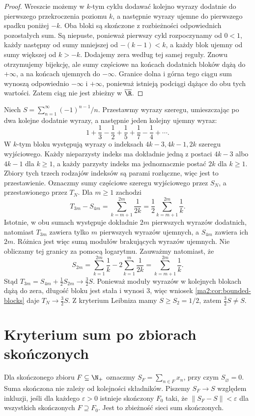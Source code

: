 \begin{proof}
Wreszcie możemy w $k$-tym cyklu dodawać kolejno wyrazy dodatnie do pierwszego przekroczenia poziomu $k$, a następnie wyrazy ujemne do pierwszego spadku poniżej $-k$. Oba bloki są skończone z rozbieżności odpowiednich pozostałych sum. Są niepuste, ponieważ pierwszy cykl rozpoczynamy od $0<1$, każdy następny od sumy mniejszej od $-(k-1)<k$, a każdy blok ujemny od sumy większej od $k>-k$. Dodajemy zera według tej samej reguły. Znowu otrzymujemy bijekcję, ale sumy częściowe na końcach dodatnich bloków dążą do $+\infty$, a na końcach ujemnych do $-\infty$. Granice dolna i górna tego ciągu sum wynoszą odpowiednio $-\infty$ i $+\infty$, ponieważ istnieją podciągi dążące do obu tych wartości. Zatem ciąg nie jest zbieżny w $\overline{\R}$.
\end{proof}

\begin{przyklad}
\label{ma1:ex:harmonic-rearrangement}
Niech $S=\sum_{n=1}^\infty(-1)^{n-1}/n$. Przestawmy wyrazy szeregu, umieszczając po dwa kolejne dodatnie wyrazy, a następnie jeden kolejny ujemny wyraz:
\[
 1+\frac13-\frac12+\frac15+\frac17-\frac14+\cdots.
\]
W $k$-tym bloku występują wyrazy o indeksach $4k-3,4k-1,2k$ szeregu wyjściowego. Każdy nieparzysty indeks ma dokładnie jedną z postaci $4k-3$ albo $4k-1$ dla $k\ge1$, a każdy parzysty indeks ma jednoznacznie postać $2k$ dla $k\ge1$. Zbiory tych trzech rodzajów indeksów są parami rozłączne, więc jest to przestawienie.
Oznaczmy sumy częściowe szeregu wyjściowego przez $S_N$, a przestawionego przez $T_N$. Dla $m\ge1$ zachodzi
\[
 T_{3m}-S_{4m}
 =\sum_{k=m+1}^{2m}\frac1{2k}
 =\frac12\sum_{k=m+1}^{2m}\frac1k.
\]
Istotnie, w obu sumach występuje dokładnie $2m$ pierwszych wyrazów dodatnich, natomiast $T_{3m}$ zawiera tylko $m$ pierwszych wyrazów ujemnych, a $S_{4m}$ zawiera ich $2m$. Różnica jest więc sumą modułów brakujących wyrazów ujemnych. Nie obliczamy tej granicy za pomocą logarytmu. Zauważmy natomiast, że
\[
 S_{2m}=\sum_{k=1}^{2m}\frac1k
 -2\sum_{k=1}^m\frac1{2k}
 =\sum_{k=m+1}^{2m}\frac1k.
\]
Stąd $T_{3m}=S_{4m}+\tfrac12 S_{2m}\to\tfrac32 S$. Ponieważ moduły wyrazów w kolejnych blokach dążą do zera, długość bloku jest stała i wynosi $3$, więc wniosek \ref{ma2:cor:bounded-blocks} daje $T_N\to\tfrac32 S$. Z kryterium Leibniza mamy $S\ge S_2=1/2$, zatem $\tfrac32 S\ne S$.
\end{przyklad}


\section{Kryterium sum po zbiorach skończonych}
Dla skończonego zbioru $F\subseteq\N_+$ oznaczmy
$S_F=\sum_{n\in F}x_n$, przy czym $S_\varnothing=0$.
Suma skończona nie zależy od kolejności składników.
Piszemy $S_F\to S$ względem inkluzji, jeśli dla każdego
$\varepsilon>0$ istnieje skończony $F_0$ taki, że
$\|S_F-S\|<\varepsilon$ dla wszystkich skończonych
$F\supseteq F_0$. Jest to zbieżność sieci sum skończonych.

